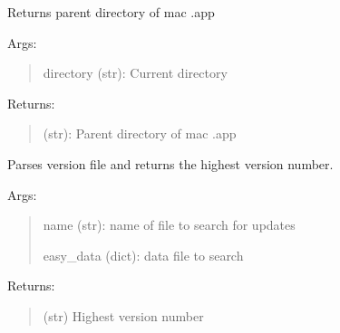 \documentclass[letterpaper,10pt,english]{sphinxmanual}
\begin{document}
\label{api:module-pyi_updater.client.utils}

\begin{fulllineitems}
\label{api:pyi_updater.client.utils.get_mac_dot_app_dir}
Returns parent directory of mac .app

Args:
\begin{quote}

directory (str): Current directory
\end{quote}

Returns:
\begin{quote}

(str): Parent directory of mac .app
\end{quote}

\end{fulllineitems}


\begin{fulllineitems}
\label{api:pyi_updater.client.utils.get_highest_version}
Parses version file and returns the highest version number.

Args:
\begin{quote}

name (str): name of file to search for updates

easy\_data (dict): data file to search
\end{quote}

Returns:
\begin{quote}

(str) Highest version number
\end{quote}

\end{fulllineitems}

\end{document}
